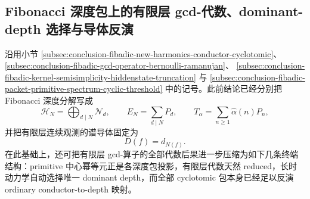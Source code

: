 \subsection{Fibonacci 深度包上的有限层 gcd-代数、dominant-depth 选择与导体反演}\label{subsec:conclusion-fibadic-finite-layer-gcd-reduced-dominantdepth-conductor-inversion}
沿用小节 \ref{subsec:conclusion-fibadic-new-harmonics-conductor-cyclotomic}、
\ref{subsec:conclusion-fibadic-gcd-operator-bernoulli-ramanujan}、
\ref{subsec:conclusion-fibadic-kernel-semisimplicity-hiddenstate-truncation}
与
\ref{subsec:conclusion-fibadic-packet-primitive-spectrum-cyclic-threshold}
中的记号。此前结论已经分别把 Fibonacci 深度分解写成
\[
\mathcal H_N=\bigoplus_{d\mid N}\mathcal N_d,
\qquad
E_N=\sum_{d\mid N}P_d,
\qquad
T_\alpha=\sum_{n\ge 1}\widehat\alpha(n)P_n,
\]
并把有限层连续观测的谱导体固定为
\[
D(f)=d_{N(f)}.
\]
在此基础上，还可把有限层 gcd-算子的全部代数后果进一步压缩为如下几条终端结构：primitive 中心幂等元正是各深度包投影，有限层代数天然 reduced，长时动力学自动选择唯一 dominant depth，而全部 cyclotomic 包本身已经足以反演 ordinary conductor-to-depth 映射。

